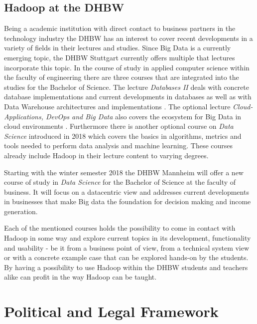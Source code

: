 \subsection{Hadoop at the DHBW}

Being a academic institution with direct contact to 
business partners in the technology industry the \ac{DHBW} has an interest to cover recent developments in a variety of fields in their lectures and studies.
Since Big Data is a currently emerging topic,
the \ac{DHBW} Stuttgart currently offers multiple that lectures incorporate this topic.
In the course of study in applied computer science within the faculty of engineering there are three courses that are integrated into the studies for the Bachelor of Science.
The lecture \emph{Databases II} deals with concrete database implementations and current developments in databases as well as with Data Warehouse architectures and implementations \autocite[][]{DHBW2017aidbii}.
The optional lecture \emph{Cloud-Applications, DevOps and Big Data} also covers the ecosystem for Big Data in cloud environments \autocite[][]{DHBW2017aiwf}.
Furthermore there is another optional course on \emph{Data Science} introduced in 2018 which covers the basics in algorithms, metrics and tools needed to perform data analysis and machine learning.
These courses already include Hadoop in their lecture content to varying degrees.

Starting with the winter semester 2018 the \ac{DHBW} Mannheim will offer a new course of study in \emph{Data Science} for the Bachelor of Science at the faculty of business.
It will focus on a datacentric view and addresses current developments in businesses that make Big data the foundation for decision making and income generation.
\autocite[][]{DHBW2018mannheimdatascience}

Each of the mentioned courses holds the possibility to come in contact with Hadoop in some way and explore current topics in its development, functionality and usability - be it from a business point of view, from a technical system view or with a concrete example case that can be explored hands-on by the students.
By having a possibility to use Hadoop within the \ac{DHBW} students and teachers alike can profit in the way Hadoop can be taught.

\section{Political and Legal Framework}
\label{sec:fund:legal}
\label{sota-pol-legal}

